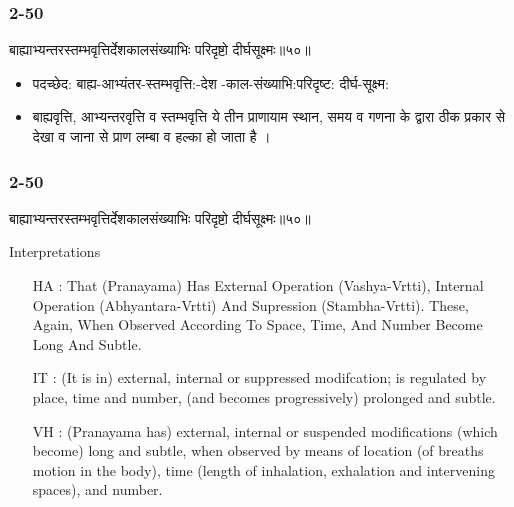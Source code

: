 \begin{frame}[fragile]\frametitle{2-50}
\begin{sanskrit}
बाह्याभ्यन्तरस्तम्भवृत्तिर्देशकालसंख्याभिः परिदृष्टो दीर्घसूक्ष्मः॥५०॥
\end{sanskrit}

	\begin{itemize}
	\item पदच्छेद: बाह्य-आभ्यंतर-स्तम्भवृत्ति:-देश -काल-संख्याभि:परिदृष्ट: दीर्घ-सूक्ष्म:
	\item बाह्यवृत्ति, आभ्यन्तरवृत्ति व स्तम्भवृत्ति ये तीन प्राणायाम स्थान, समय व गणना के द्वारा ठीक प्रकार से देखा व जाना से प्राण लम्बा व हल्का हो जाता है ।
	\end{itemize}	
\end{frame}

\begin{frame}[fragile]\frametitle{2-50}
\begin{sanskrit}
बाह्याभ्यन्तरस्तम्भवृत्तिर्देशकालसंख्याभिः परिदृष्टो दीर्घसूक्ष्मः॥५०॥
\end{sanskrit}

Interpretations
\begin{itemize}
\item [HA]: That (Pranayama) Has External Operation (Vashya-Vrtti), Internal Operation (Abhyantara-Vrtti) And Supression (Stambha-Vrtti). These, Again, When Observed According To Space, Time, And Number Become Long And Subtle.
\item [IT]: (It is in) external, internal or suppressed modifcation; is regulated by place, time and number, (and becomes progressively) prolonged and subtle.
\item [VH]: (Pranayama has) external, internal or suspended modifications (which become) long and subtle, when observed by means of location (of breaths motion in the body), time (length of inhalation, exhalation and intervening spaces), and number.
\end{itemize}
\end{frame}


